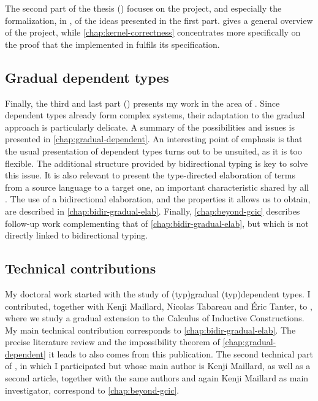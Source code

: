 The second part of the thesis () focuses on the  project,
and especially the formalization, in , of the ideas presented in the first part.
 gives a general overview of the project, while
\cref{chap:kernel-correctness} concentrates more specifically on the proof that the
 implemented in  fulfils its specification.

\subsection{Gradual dependent types}

Finally, the third and last part () presents my work in the area
of . Since dependent types already form complex systems, their adaptation
to the gradual approach is particularly delicate. A summary of the possibilities and issues is
presented in \cref{chap:gradual-dependent}. An interesting point of emphasis is that the
usual presentation of dependent types turns out to be unsuited, as it is too flexible.
The additional structure provided by bidirectional typing is key to solve this issue. It is also
relevant to present the type-directed elaboration of terms from a source language
to a target one, an important characteristic shared by all .
The use of a bidirectional elaboration, and the properties it allows us to obtain, are described
in \cref{chap:bidir-gradual-elab}. Finally, \cref{chap:beyond-gcic} describes follow-up work
complementing that of \cref{chap:bidir-gradual-elab}, but which is not directly linked to
bidirectional typing.

\subsection{Technical contributions}

My doctoral work started with the study of \kl(typ){gradual}
\kl(typ){dependent} types.
I contributed, together with Kenji Maillard, Nicolas Tabareau and Éric Tanter, to
, where we study a gradual extension to the
Calculus of Inductive Constructions. My main technical contribution corresponds
to \cref{chap:bidir-gradual-elab}. The precise literature review and the impossibility
theorem of \cref{chap:gradual-dependent} it leads to also comes from this
publication.
The second technical part of \textcite{LennonBertrand2022}, in which I participated but
whose main author is Kenji Maillard, as well as a second article,%
%
together with the same authors and again Kenji Maillard as main investigator,
correspond to \cref{chap:beyond-gcic}.

